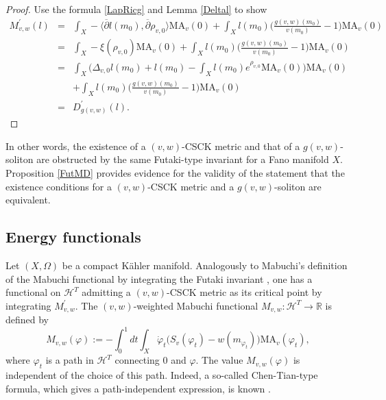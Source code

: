 \documentclass[12pt]{amsart}
\numberwithin{equation}{section}%
\theoremstyle{plain}
\theoremstyle{definition}
\newcommand{\dbar}{\overline{\partial}}
\newcommand{\MA}{\mathrm{MA}}
\renewcommand{\phi}{\varphi}
\newcommand{\1}{\mathbf{1}}
\begin{document}
\begin{proof}
Use the formula \eqref{LapRicg}
and Lemma \ref{Deltal} to show
\begin{eqnarray*}
M^{\prime}_{v,w}(l)&=&\int_{X}
-\langle \dbar l(m_{0}),\dbar\rho_{v,0}\rangle\MA_{v}(0)
+\int_{X}l(m_{0})\Big(\frac{g(v,w)(m_{0})}{v(m_{0})}-1\Big)\MA_{v}(0) \\
&=& \int_{X}-\xi(\rho_{v,0})\MA_{v}(0)
+\int_{X}l(m_{0})\Big(\frac{g(v,w)(m_{0})}{v(m_{0})}-1\Big)\MA_{v}(0) \\
&=&\int_{X}\Big(\Delta_{v,0}l(m_{0})+l(m_{0})
-\int_{X}l(m_{0})e^{\rho_{v,0}}\MA_{v}(0)\Big)\MA_{v}(0) \\
&&+\int_{X}l(m_{0})\Big(\frac{g(v,w)(m_{0})}{v(m_{0})}-1\Big)\MA_{v}(0) \\
&=&D^{\prime}_{g(v,w)}(l).
\end{eqnarray*}
\end{proof}

In other words, the existence of a $(v,w)$-CSCK metric and that of a $g(v,w)$-soliton
are obstructed by the same Futaki-type invariant for a Fano manifold $X$.
Proposition \ref{FutMD} provides evidence for the validity of the statement
that the existence conditions for
a $(v,w)$-CSCK metric and a $g(v,w)$-soliton are equivalent.

\subsection{Energy functionals}
Let $(X,\Omega)$ be a compact K\"ahler manifold.
Analogously to Mabuchi's definition of the Mabuchi functional \cite{Ma86}
by integrating the Futaki invariant \cite{Fu83},
one has a functional on $\mathcal{H}^{T}$
admitting a $(v,w)$-CSCK metric as its critical point
by integrating $M_{v,w}^{\prime}$.
The $(v,w)$-weighted Mabuchi functional
$M_{v,w}:\mathcal{H}^{T}\to\mathbb{R}$ is defined by
\begin{equation}
M_{v,w}(\phi):=-\int_{0}^{1}dt\int_{X}\dot{\phi}_{t}
\Big(S_{v}(\phi_{t})-w(m_{\phi_{t}})\Big)\MA_{v}(\phi_{t}),
\end{equation}
where $\phi_{t}$ is a path in $\mathcal{H}^{T}$ connecting $0$ and $\phi$.
The value $M_{v,w}(\phi)$ is independent of the choice of this path.
Indeed, a so-called Chen-Tian-type formula,
which gives a path-independent expression, is known \cite{BJT24, Lah19}.
\end{document}

